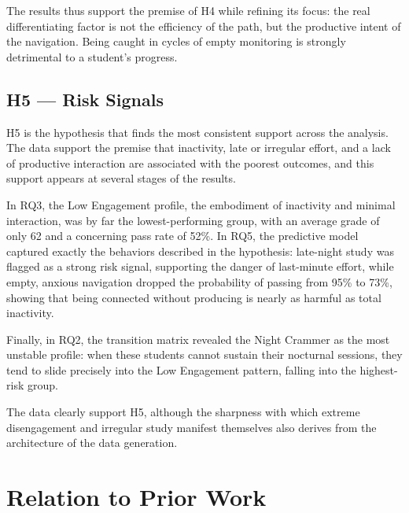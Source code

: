 The results thus support the premise of H4 while refining its focus: the real differentiating factor is not the efficiency of the path, but the productive intent of the navigation. Being caught in cycles of empty monitoring is strongly detrimental to a student's progress.

\subsection{H5 --- Risk Signals}

H5 is the hypothesis that finds the most consistent support across the analysis. The data support the premise that inactivity, late or irregular effort, and a lack of productive interaction are associated with the poorest outcomes, and this support appears at several stages of the results.

In RQ3, the Low Engagement profile, the embodiment of inactivity and minimal interaction, was by far the lowest-performing group, with an average grade of only 62 and a concerning pass rate of 52\%. In RQ5, the predictive model captured exactly the behaviors described in the hypothesis: late-night study was flagged as a strong risk signal, supporting the danger of last-minute effort, while empty, anxious navigation dropped the probability of passing from 95\% to 73\%, showing that being connected without producing is nearly as harmful as total inactivity.

Finally, in RQ2, the transition matrix revealed the Night Crammer as the most unstable profile: when these students cannot sustain their nocturnal sessions, they tend to slide precisely into the Low Engagement pattern, falling into the highest-risk group.

The data clearly support H5, although the sharpness with which extreme disengagement and irregular study manifest themselves also derives from the architecture of the data generation.

\section{Relation to Prior Work}
\label{sec:relation-to-prior-work}

